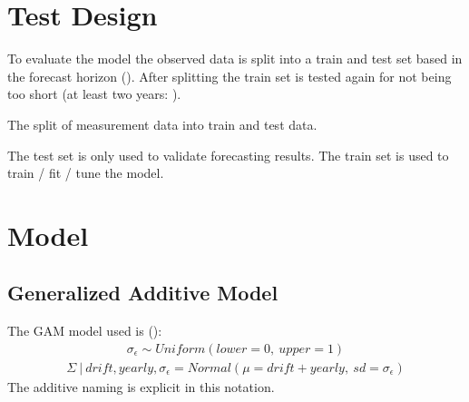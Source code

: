 \documentclass[letterpaper,10pt,english]{sphinxmanual}
\let\sphinxpxdimen\pdfpxdimen\else\newdimen\sphinxpxdimen
\begin{document}
\section{Test Design}
\label{\detokenize{modeling:test-design}}
To evaluate the model the observed data is split into a train and test set based in the forecast horizon ({\hyperref[\detokenize{autoapi/src/preprocess/preprocess/index:src.preprocess.preprocess.split_last}]{}}).
After splitting the train set is tested again for not being too short (at least two years: {\hyperref[\detokenize{autoapi/src/preprocess/preprocess/index:src.preprocess.preprocess.too_short}]{}}).
\begin{quote}

\noindent{\hspace*{\fill}\sphinxincludegraphics[width=600\sphinxpxdimen]{{train_test}.png}\hspace*{\fill}}
\end{quote}

The split of measurement data into train and test data.

The test set is only used to validate forecasting results.
The train set is used to train / fit / tune the model.


\section{Model}
\label{\detokenize{modeling:model}}

\subsection{Generalized Additive Model}
\label{\detokenize{modeling:generalized-additive-model}}
The GAM model used is ({\hyperref[\detokenize{autoapi/src/model/model/index:src.model.model.create_model}]{}}):
\begin{equation*}
\begin{split}\sigma_\epsilon \sim Uniform(lower=0, \:upper=1)\end{split}
\end{equation*}\begin{equation*}
\begin{split}\Sigma\:|\:drift, yearly, \sigma_\epsilon = Normal(\mu=drift + yearly, \:sd=\sigma_\epsilon)\end{split}
\end{equation*}
The additive naming is explicit in this notation.
\end{document}
